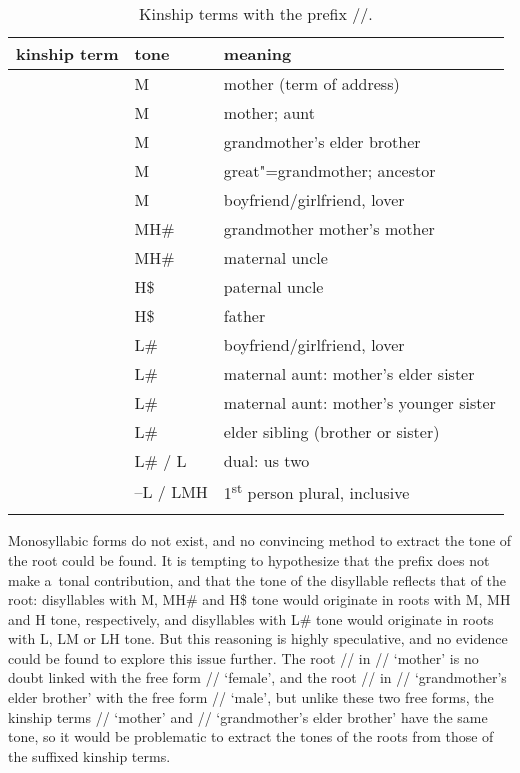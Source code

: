 	\begin{table}%
		\caption{\label{tab:kinshiptermswiththeprefix}Kinship terms with the prefix //.}
		\begin{tabularx}{\textwidth}{ Q l l }
			\lsptoprule
			kinship term & tone & meaning\\ \midrule
			 & M & mother ({term of address})\\
			 & M & mother; aunt\\
			 & M & grandmother’s elder brother\\
			 & M & great"=grandmother; ancestor\\
			 & M & boyfriend/girlfriend, lover\\
			 & MH\# & grandmother mother’s mother\\
			 & MH\# & maternal uncle\\
			 & H\$ & paternal uncle\\
			 & H\$ & father\\
			 & L\# & boyfriend/girlfriend, lover\\
			 & L\# & maternal aunt: mother’s elder sister\\
			 & L\# & maternal aunt: mother’s younger sister\\
			 & L\# & elder sibling (brother or sister)\\
			 & L\# / L & dual: us two\\
			 & --L / LMH & 1\textsuperscript{st} person plural, inclusive\\
			\lspbottomrule
		\end{tabularx}
	\end{table}
	
	Monosyllabic forms do not exist, and no convincing method to extract the tone of the root could be
	found. It is tempting to hypothesize that the prefix does not make a~tonal contribution, and that
	the tone of the disyllable reflects that of the root: disyllables with M, MH\# and H\$ tone would
	originate in roots with M, MH and H tone, respectively, and disyllables with L\# tone would originate
	in roots with L, LM or LH tone. But this reasoning is highly speculative, and no evidence could be found
	to explore this issue further. The root // in // ‘mother’ is no doubt linked with
	the free form // ‘female’, and the root // in // ‘grandmother's elder brother’ with the free form // ‘male’, but unlike these two free forms, the kinship terms // ‘mother’ and // ‘grandmother's elder brother’ have the same tone, so it would be problematic to extract the tones of the roots from those of the suffixed kinship terms.
	

